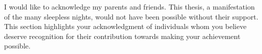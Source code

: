 {}

I would like to acknowledge my parents and friends. This thesis, a manifestation of the many sleepless nights, would not have been possible without their support. This section highlights your acknowledgment of individuals whom you believe deserve recognition for their contribution towards making your achievement possible.  

\clearpage %
